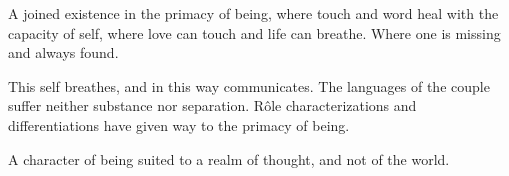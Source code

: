 

A joined existence in the primacy of being, where touch and word heal
with the capacity of self, where love can touch and life can breathe.
Where one is missing and always found.  

This self breathes, and in this way communicates.  The languages of
the couple suffer neither substance nor separation.  R\^{o}le
characterizations and differentiations have given way to the primacy
of being.  

A character of being suited to a realm of thought, and not of the
world.

\bye
